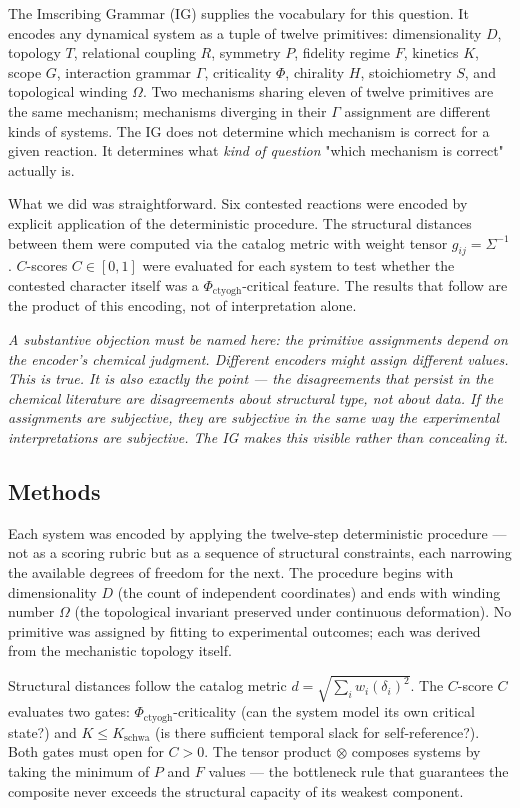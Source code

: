 \documentclass[12pt,a4paper]{article}
\begin{document}
The Imscribing Grammar (IG) supplies the vocabulary for this question. It encodes any dynamical system as a tuple of twelve primitives: dimensionality $D$, topology $T$, relational coupling $R$, symmetry $P$, fidelity regime $F$, kinetics $K$, scope $G$, interaction grammar $\Gamma$, criticality $\Phi$, chirality $H$, stoichiometry $S$, and topological winding $\Omega$. Two mechanisms sharing eleven of twelve primitives are the same mechanism; mechanisms diverging in their $\Gamma$ assignment are different kinds of systems. The IG does not determine which mechanism is correct for a given reaction. It determines what \emph{kind of question} "which mechanism is correct" actually is.

What we did was straightforward. Six contested reactions were encoded by explicit application of the deterministic procedure. The structural distances between them were computed via the catalog metric with weight tensor $g_{ij} = \Sigma^{-1}$. $C$-scores $C \in [0,1]$ were evaluated for each system to test whether the contested character itself was a $\Phi_{\text{ctyogh}}$-critical feature. The results that follow are the product of this encoding, not of interpretation alone.

\emph{A substantive objection must be named here: the primitive assignments depend on the encoder's chemical judgment. Different encoders might assign different values. This is true. It is also exactly the point --- the disagreements that persist in the chemical literature are disagreements about structural type, not about data. If the assignments are subjective, they are subjective in the same way the experimental interpretations are subjective. The IG makes this visible rather than concealing it.}

\subsection{Methods}

Each system was encoded by applying the twelve-step deterministic procedure --- not as a scoring rubric but as a sequence of structural constraints, each narrowing the available degrees of freedom for the next. The procedure begins with dimensionality $D$ (the count of independent coordinates) and ends with winding number $\Omega$ (the topological invariant preserved under continuous deformation). No primitive was assigned by fitting to experimental outcomes; each was derived from the mechanistic topology itself.

Structural distances follow the catalog metric $d = \sqrt{\sum_i w_i (\delta_i)^2}$. The $C$-score $C$ evaluates two gates: $\Phi_{\text{ctyogh}}$-criticality (can the system model its own critical state?) and $K \leq K_{\text{schwa}}$ (is there sufficient temporal slack for self-reference?). Both gates must open for $C > 0$. The tensor product $\otimes$ composes systems by taking the minimum of $P$ and $F$ values --- the bottleneck rule that guarantees the composite never exceeds the structural capacity of its weakest component.
\end{document}
